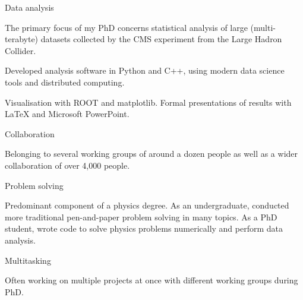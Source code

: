 

\newcommand{\vpadding}{\vspace{0.5mm}}

\begin{cventries}

    \cventry
    {} %
    {Data analysis} %
    {} %
    {} %
    {
      \begin{cvitems}
        \item {The primary focus of my PhD concerns statistical analysis of large (multi-terabyte) datasets collected by the CMS experiment from the Large Hadron Collider.}
        \item {Developed analysis software in Python and C++, using modern data science tools and distributed computing.}
        \item{Visualisation with ROOT and matplotlib. Formal presentations of results with LaTeX and Microsoft PowerPoint.}
        \vpadding
        \end{cvitems}
    }

    \cventry
    {}
    {Collaboration}
    {}
    {}
    {
      \begin{cvitems}
        \item {Belonging to several working groups of around a dozen people as well as a wider collaboration of over 4,000 people.}
        \vpadding
        \end{cvitems}
    }

    \cventry
    {}
    {Problem solving}
    {}
    {}
    {
      \begin{cvitems}
        \item {Predominant component of a physics degree. As an undergraduate, conducted more traditional pen-and-paper problem solving in many topics. As a PhD student, wrote code to solve physics problems numerically and perform data analysis.}
        \vpadding
        \end{cvitems}
    }

    \cventry
    {}
    {Multitasking}
    {}
    {}
    {
      \begin{cvitems}
        \item {Often working on multiple projects at once with different working groups during PhD.}
        \vpadding
        \end{cvitems}
    }


\end{cventries}
